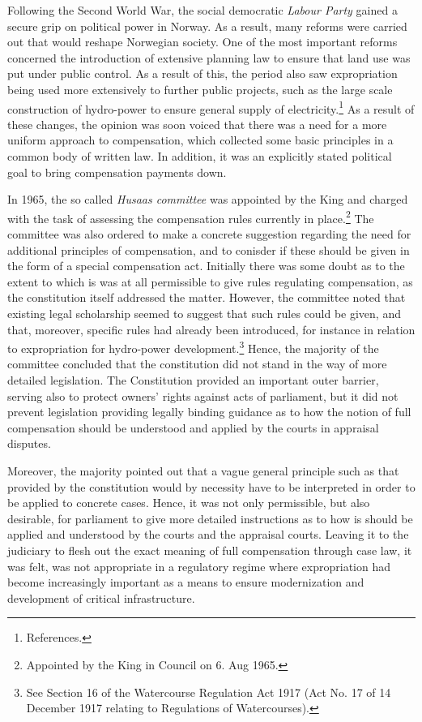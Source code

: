 Following the Second World War, the social democratic \emph{Labour Party} gained a secure grip on political power in Norway. As a result, many reforms were carried out that would reshape Norwegian society. One of the most important reforms concerned the introduction of extensive planning law to ensure that land use was put under public control. As a result of this, the period also saw expropriation being used more extensively to further public projects, such as the large scale construction of hydro-power to ensure general supply of electricity.\footnote{References.} As a result of these changes, the opinion was soon voiced that there was a need for a more uniform approach to compensation, which collected some basic principles in a common body of written law. In addition, it was an explicitly stated political goal to bring compensation payments down.

In 1965, the so called \emph{Husaas committee} was appointed by the King and charged with the task of assessing the compensation rules currently in place.\footnote{Appointed by the King in Council on 6. Aug 1965.} The committee was also ordered to make a concrete suggestion regarding the need for additional principles of compensation, and to conisder if these should be given in the form of a special compensation act. Initially there was some doubt as to the extent to which is was at all permissible to give rules regulating compensation, as the constitution itself addressed the matter. However, the committee noted that existing legal scholarship seemed to suggest that such rules could be given, and that, moreover, specific rules had already been introduced, for instance in relation to expropriation for hydro-power development.\footnote{See Section 16 of the Watercourse Regulation Act 1917 (Act No. 17 of 14 December 1917 relating to Regulations of Watercourses).} Hence, the majority of the committee concluded that the constitution did not stand in the way of more detailed legislation. The Constitution provided an important outer barrier, serving also to protect owners' rights against acts of parliament, but it did not prevent legislation providing legally binding guidance as to how the notion of full compensation should be understood and applied by the courts in appraisal disputes.

Moreover, the majority pointed out that a vague general principle such as that provided by the constitution would by necessity have to be interpreted in order to be applied to concrete cases. Hence, it was not only permissible, but also desirable, for parliament to give more detailed instructions as to how is should be applied and understood by the courts and the appraisal courts. Leaving it to the judiciary to flesh out the exact meaning of full compensation through case law, it was felt, was not appropriate in a regulatory regime where expropriation had become increasingly important as a means to ensure modernization and development of critical infrastructure.

